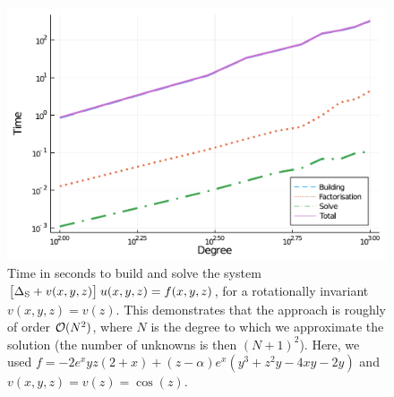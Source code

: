 \documentclass[11pt, oneside]{article}   	%
\begin{document}
\begin{figure}[t]
	\centering %
	\includegraphics[scale=0.35]{complexity-Nend=1000}
	\caption{Time in seconds to build and solve the system $\big[\Delta_{\rm S} + v(x,y,z) \big] \: u(x,y,z) = f(x,y,z)$, for a rotationally invariant $v(x,y,z) = v(z)$. This demonstrates that the approach is roughly of order $\mathcal{O}(N^2)$, where $N$ is the degree to which we approximate the solution (the number of unknowns is then $(N+1)^2$). Here, we used $f = -2e^{x}yz(2+x) + (z - \alpha) e^{x} (y^3 + z^2 y - 4xy - 2y)$ and $v(x,y,z) = v(z) = \cos(z)$.}
	\centering
	\label{fig:complexity}
\end{figure}
\end{document}

